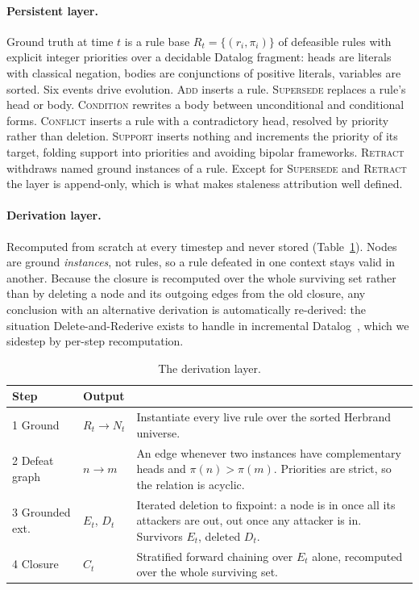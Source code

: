 \documentclass{article} %
\newcommand{\Ct}{\ensuremath{C_t}}
\newcommand{\Rt}{\ensuremath{R_t}}
\newcommand{\Et}{\ensuremath{E_t}}
\newcommand{\Dt}{\ensuremath{D_t}}
\begin{document}
\paragraph{Persistent layer.}
Ground truth at time $t$ is a rule base $\Rt = \{(r_i, \pi_i)\}$ of defeasible rules with explicit integer priorities over a decidable Datalog fragment: heads are literals with classical negation, bodies are conjunctions of positive literals, variables are sorted. Six events drive evolution. \textsc{Add} inserts a rule. \textsc{Supersede} replaces a rule's head or body. \textsc{Condition} rewrites a body between unconditional and conditional forms. \textsc{Conflict} inserts a rule with a contradictory head, resolved by priority rather than deletion. \textsc{Support} inserts nothing and increments the priority of its target, folding support into priorities and avoiding bipolar frameworks. \textsc{Retract} withdraws named ground instances of a rule. Except for \textsc{Supersede} and \textsc{Retract} the layer is append-only, which is what makes staleness attribution well defined.

\paragraph{Derivation layer.}
Recomputed from scratch at every timestep and never stored (Table~\ref{tab:derivation}). Nodes are ground \emph{instances}, not rules, so a rule defeated in one context stays valid in another. Because the closure is recomputed over the whole surviving set rather than by deleting a node and its outgoing edges from the old closure, any conclusion with an alternative derivation is automatically re-derived: the situation Delete-and-Rederive exists to handle in incremental Datalog~\citep{gupta1993maintaining}, which we sidestep by per-step recomputation.

\begin{table}[t]
\centering\small
\begin{tabular}{@{}p{2.3cm}p{2.2cm}p{8.4cm}@{}}
\toprule
Step & Output & \\
\midrule
1 Ground & $\Rt \to N_t$ & Instantiate every live rule over the sorted Herbrand universe. \\
2 Defeat graph & $n \to m$ & An edge whenever two instances have complementary heads and $\pi(n) > \pi(m)$. Priorities are strict, so the relation is acyclic. \\
3 Grounded ext. & $\Et$, $\Dt$ & Iterated deletion to fixpoint: a node is in once all its attackers are out, out once any attacker is in. Survivors $\Et$, deleted $\Dt$. \\
4 Closure & $\Ct$ & Stratified forward chaining over $\Et$ alone, recomputed over the whole surviving set. \\
\bottomrule
\end{tabular}
\caption{The derivation layer.}
\label{tab:derivation}
\end{table}
\end{document}
